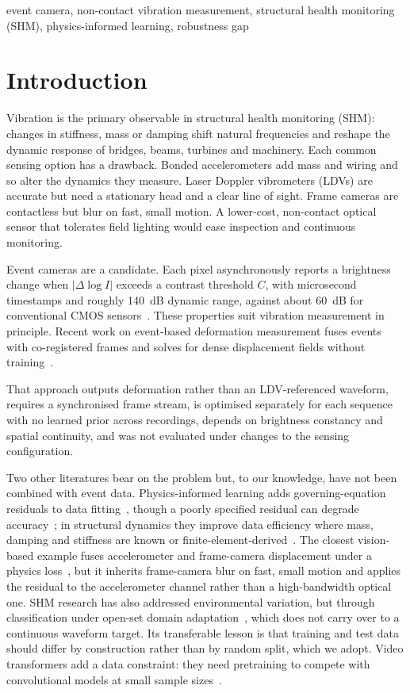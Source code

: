 \documentclass[conference]{IEEEtran}
\begin{document}
\begin{IEEEkeywords}
event camera, non-contact vibration measurement, structural health monitoring (SHM), physics-informed learning, robustness gap
\end{IEEEkeywords}

\section{Introduction}
Vibration is the primary observable in structural health monitoring (SHM): changes in stiffness, mass or damping shift natural frequencies and reshape the dynamic response of bridges, beams, turbines and machinery. Each common sensing option has a drawback. Bonded accelerometers add mass and wiring and so alter the dynamics they measure. Laser Doppler vibrometers (LDVs) are accurate but need a stationary head and a clear line of sight. Frame cameras are contactless but blur on fast, small motion. A lower-cost, non-contact optical sensor that tolerates field lighting would ease inspection and continuous monitoring.

Event cameras are a candidate. Each pixel asynchronously reports a brightness change when $|\Delta \log I|$ exceeds a contrast threshold $C$, with microsecond timestamps and roughly 140~dB dynamic range, against about 60~dB for conventional CMOS sensors~\cite{Gallego2020,Rebecq2021}. These properties suit vibration measurement in principle. Recent work on event-based deformation measurement fuses events with co-registered frames and solves for dense displacement fields without training~\cite{Wu2026}.

That approach outputs deformation rather than an LDV-referenced waveform, requires a synchronised frame stream, is optimised separately for each sequence with no learned prior across recordings, depends on brightness constancy and spatial continuity, and was not evaluated under changes to the sensing configuration.

Two other literatures bear on the problem but, to our knowledge, have not been combined with event data. Physics-informed learning adds governing-equation residuals to data fitting~\cite{Raissi2019}, though a poorly specified residual can degrade accuracy~\cite{Karniadakis2021}; in structural dynamics they improve data efficiency where mass, damping and stiffness are known or finite-element-derived~\cite{Wang2024}. The closest vision-based example fuses accelerometer and frame-camera displacement under a physics loss~\cite{Wu2025}, but it inherits frame-camera blur on fast, small motion and applies the residual to the accelerometer channel rather than a high-bandwidth optical one. SHM research has also addressed environmental variation, but through classification under open-set domain adaptation~\cite{Zhou2024}, which does not carry over to a continuous waveform target. Its transferable lesson is that training and test data should differ by construction rather than by random split, which we adopt. Video transformers add a data constraint: they need pretraining to compete with convolutional models at small sample sizes~\cite{Bertasius2021}.
\end{document}

